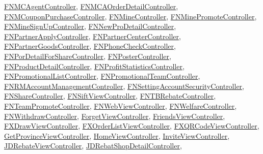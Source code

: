 \mbox{\hyperlink{interface_f_n_m_c_agent_controller}{F\+N\+M\+C\+Agent\+Controller}}, \mbox{\hyperlink{interface_f_n_m_c_a_order_detail_controller}{F\+N\+M\+C\+A\+Order\+Detail\+Controller}}, \mbox{\hyperlink{interface_f_n_m_coupon_purchase_controller}{F\+N\+M\+Coupon\+Purchase\+Controller}}, \mbox{\hyperlink{interface_f_n_mine_controller}{F\+N\+Mine\+Controller}}, \mbox{\hyperlink{interface_f_n_mine_promote_controller}{F\+N\+Mine\+Promote\+Controller}}, \mbox{\hyperlink{interface_f_n_mine_sign_up_controller}{F\+N\+Mine\+Sign\+Up\+Controller}}, \mbox{\hyperlink{interface_f_n_new_pro_detail_controller}{F\+N\+New\+Pro\+Detail\+Controller}}, \mbox{\hyperlink{interface_f_n_partner_apply_controller}{F\+N\+Partner\+Apply\+Controller}}, \mbox{\hyperlink{interface_f_n_partner_center_controller}{F\+N\+Partner\+Center\+Controller}}, \mbox{\hyperlink{interface_f_n_partner_goods_controller}{F\+N\+Partner\+Goods\+Controller}}, \mbox{\hyperlink{interface_f_n_phone_check_controller}{F\+N\+Phone\+Check\+Controller}}, \mbox{\hyperlink{interface_f_n_por_detail_for_share_controller}{F\+N\+Por\+Detail\+For\+Share\+Controller}}, \mbox{\hyperlink{interface_f_n_poster_controller}{F\+N\+Poster\+Controller}}, \mbox{\hyperlink{interface_f_n_product_detail_controller}{F\+N\+Product\+Detail\+Controller}}, \mbox{\hyperlink{interface_f_n_profit_statistics_controller}{F\+N\+Profit\+Statistics\+Controller}}, \mbox{\hyperlink{interface_f_n_promotional_list_controller}{F\+N\+Promotional\+List\+Controller}}, \mbox{\hyperlink{interface_f_n_promotional_team_controller}{F\+N\+Promotional\+Team\+Controller}}, \mbox{\hyperlink{interface_f_n_r_m_account_management_controller}{F\+N\+R\+M\+Account\+Management\+Controller}}, \mbox{\hyperlink{interface_f_n_setting_account_security_controller}{F\+N\+Setting\+Account\+Security\+Controller}}, \mbox{\hyperlink{interface_f_n_share_controller}{F\+N\+Share\+Controller}}, \mbox{\hyperlink{interface_f_n_sift_view_controller}{F\+N\+Sift\+View\+Controller}}, \mbox{\hyperlink{interface_f_n_t_b_rebate_controller}{F\+N\+T\+B\+Rebate\+Controller}}, \mbox{\hyperlink{interface_f_n_team_promote_controller}{F\+N\+Team\+Promote\+Controller}}, \mbox{\hyperlink{interface_f_n_web_view_controller}{F\+N\+Web\+View\+Controller}}, \mbox{\hyperlink{interface_f_n_welfare_controller}{F\+N\+Welfare\+Controller}}, \mbox{\hyperlink{interface_f_n_withdraw_controller}{F\+N\+Withdraw\+Controller}}, \mbox{\hyperlink{interface_forget_view_controller}{Forget\+View\+Controller}}, \mbox{\hyperlink{interface_friends_view_controller}{Friends\+View\+Controller}}, \mbox{\hyperlink{interface_f_x_draw_view_controller}{F\+X\+Draw\+View\+Controller}}, \mbox{\hyperlink{interface_f_x_order_list_view_controller}{F\+X\+Order\+List\+View\+Controller}}, \mbox{\hyperlink{interface_f_x_q_r_code_view_controller}{F\+X\+Q\+R\+Code\+View\+Controller}}, \mbox{\hyperlink{interface_get_province_view_controller}{Get\+Province\+View\+Controller}}, \mbox{\hyperlink{interface_home_view_controller}{Home\+View\+Controller}}, \mbox{\hyperlink{interface_invite_view_controller}{Invite\+View\+Controller}}, \mbox{\hyperlink{interface_j_d_rebate_view_controller}{J\+D\+Rebate\+View\+Controller}}, \mbox{\hyperlink{interface_j_d_rebat_shop_detail_controller}{J\+D\+Rebat\+Shop\+Detail\+Controller}}, 